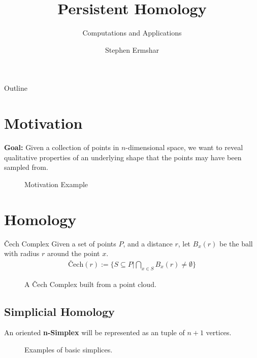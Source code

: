 

\title{Persistent Homology}
\subtitle{Computations and Applications}
\author{Stephen Ermshar}
\date{}






\begin{frame}
    \titlepage
\end{frame}

\begin{frame}{Outline}
	\tableofcontents
\end{frame}

\section[Motivation]{Motivation}
\begin{frame}
	\textbf{Goal:} Given a collection of points in \(n\)-dimensional space, we want to reveal qualitative properties of an underlying shape that the points may have been sampled from.

	\begin{figure}
		
		\caption{Motivation Example}
	\end{figure}
\end{frame}

\section[Homology]{Homology}
\begin{frame}
	\begin{block}{\v{C}ech Complex}
		Given a set of points \(P\), and a distance \(r\), let \(B_x(r)\) be the ball with radius \(r\) around the point \(x\).
		\begin{align*}
			\textrm{\v{C}ech}(r) := \{ S \subseteq P | \bigcap_{x\in S} B_x(r) \neq \emptyset \}
		\end{align*}
		\cite{wagner}
	\end{block}
	\begin{figure}
		
		\caption{A \v{C}ech Complex built from a point cloud.}
	\end{figure}
\end{frame}

\subsection{Simplicial Homology}
\begin{frame}
	\begin{definition}
		An oriented \textbf{n-Simplex} will be represented as an tuple of \(n+1\) vertices.
	\end{definition}
	\begin{figure}
		
		\caption{Examples of basic simplices.}
	\end{figure}
\end{frame}

